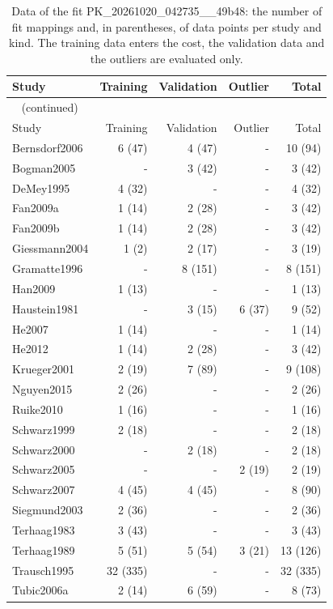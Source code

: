 \begin{longtable}{lrrrr}
\caption{Data of the fit PK\_20261020\_042735\_\_49b48: the number of fit mappings and, in parentheses, of data points per study and kind. The training data enters the cost, the validation data and the outliers are evaluated only.}\label{tab:data:PK_20261020_042735__49b48} \\
\toprule
Study & Training & Validation & Outlier & Total \\
\midrule
\endfirsthead
\multicolumn{5}{l}{\small\tablename~\thetable{} (continued)} \\
\toprule
Study & Training & Validation & Outlier & Total \\
\midrule
\endhead
\bottomrule
\endlastfoot
Bernsdorf2006 & 6 (47) & 4 (47) & - & 10 (94) \\
Bogman2005 & - & 3 (42) & - & 3 (42) \\
DeMey1995 & 4 (32) & - & - & 4 (32) \\
Fan2009a & 1 (14) & 2 (28) & - & 3 (42) \\
Fan2009b & 1 (14) & 2 (28) & - & 3 (42) \\
Giessmann2004 & 1 (2) & 2 (17) & - & 3 (19) \\
Gramatte1996 & - & 8 (151) & - & 8 (151) \\
Han2009 & 1 (13) & - & - & 1 (13) \\
Haustein1981 & - & 3 (15) & 6 (37) & 9 (52) \\
He2007 & 1 (14) & - & - & 1 (14) \\
He2012 & 1 (14) & 2 (28) & - & 3 (42) \\
Krueger2001 & 2 (19) & 7 (89) & - & 9 (108) \\
Nguyen2015 & 2 (26) & - & - & 2 (26) \\
Ruike2010 & 1 (16) & - & - & 1 (16) \\
Schwarz1999 & 2 (18) & - & - & 2 (18) \\
Schwarz2000 & - & 2 (18) & - & 2 (18) \\
Schwarz2005 & - & - & 2 (19) & 2 (19) \\
Schwarz2007 & 4 (45) & 4 (45) & - & 8 (90) \\
Siegmund2003 & 2 (36) & - & - & 2 (36) \\
Terhaag1983 & 3 (43) & - & - & 3 (43) \\
Terhaag1989 & 5 (51) & 5 (54) & 3 (21) & 13 (126) \\
Trausch1995 & 32 (335) & - & - & 32 (335) \\
Tubic2006a & 2 (14) & 6 (59) & - & 8 (73) \\

\end{longtable}
